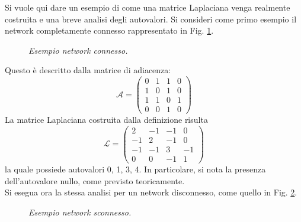 \documentclass[../main.tex]{subfiles}
\begin{document}
Si vuole qui dare un esempio di come una matrice Laplaciana venga realmente costruita e una breve analisi degli autovalori.
Si consideri come primo esempio il network completamente connesso rappresentato in Fig. \ref{fig:network_connesso}.
\begin{figure}[H]
    \centering
    \caption[Grafo di un network connesso]{\emph{Esempio network connesso.}}
    \label{fig:network_connesso}
\end{figure}
Questo \`e descritto dalla matrice di adiacenza:
\begin{equation}
    \mathcal{A}=\left(
    \begin{matrix}
        0 & 1 & 1 & 0\\
        1 & 0 & 1 & 0\\
        1 & 1 & 0 & 1\\
        0 & 0 & 1 & 0
    \end{matrix}\right)
\end{equation}
La matrice Laplaciana costruita dalla definizione risulta
\begin{equation}
    \mathcal{L}=\left(
    \begin{matrix}
        2 & -1 & -1 & 0\\
        -1 & 2 & -1 & 0\\
        -1 & -1 & 3 & -1\\
        0 & 0 & -1 & 1
    \end{matrix}\right)
\end{equation}
la quale possiede autovalori 0, 1, 3, 4.
In particolare, si nota la presenza dell'autovalore nullo, come previsto teoricamente.\\
Si esegua ora la stessa analisi per un network disconnesso, come quello in Fig. \ref{fig:network_sconnesso}.
\begin{figure}[H]
    \centering
    \caption[Grafo di un network sconnesso]{\emph{Esempio network sconnesso.}}
    \label{fig:network_sconnesso}
\end{figure}
\end{document}
